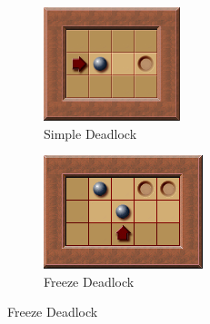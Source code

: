 \documentclass{article}
\begin{document}
\begin{figure}
     \centering
     \begin{subfigure}[b]{0.3\textwidth}
         \centering
         \includegraphics[width=\textwidth]{SimpleDeadlockExample.png}
         \caption{Simple Deadlock}
         \label{fig:simple}
     \end{subfigure}
     \hfill
     \begin{subfigure}[b]{0.3\textwidth}
         \centering
         \includegraphics[width=\textwidth]{FreezeDeadlockExample.png}
         \caption{Freeze Deadlock}
         \label{fig:freeze}
     \end{subfigure}
     \hfill

\end{figure}
\end{document}
